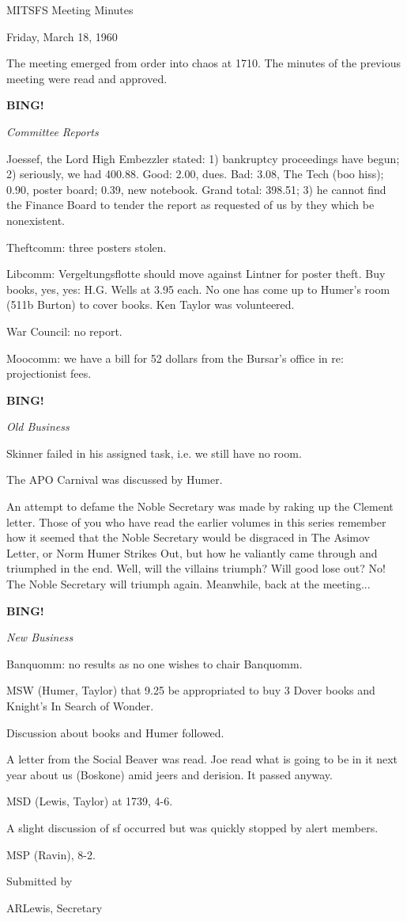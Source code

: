 \documentclass[12pt]{article}
\newcommand{\bing}{{\bf BING!} }
\newcommand{\goto}[1]{\bing \vskip 12pt \centerline{{\em{#1}}}}
\begin{document}
\begin{center}

MITSFS Meeting Minutes

Friday, March 18, 1960

\end{center}
 
\vspace{12pt}

\setlength{\parskip}{6pt}

\noindent
The meeting emerged from order into chaos at 1710. The minutes of the previous meeting were read and approved.

\goto{Committee Reports}

Joessef, the Lord High Embezzler stated: 1) bankruptcy proceedings have begun; 2) seriously, we had 400.88. Good: 2.00, dues. Bad: 3.08, The Tech (boo hiss); 0.90, poster board; 0.39, new notebook. Grand total: 398.51; 3) he cannot find the Finance Board to tender the report as requested of us by they which be nonexistent.

Theftcomm: three posters stolen.

Libcomm: Vergeltungsflotte should move against Lintner for poster theft. Buy books, yes, yes: H.G. Wells at 3.95 each. No one has come up to Humer's room (511b Burton) to cover books. Ken Taylor was volunteered.

War Council: no report.

Moocomm: we have a bill for 52 dollars from the Bursar's office in re: projectionist fees.

\goto{Old Business}

Skinner failed in his assigned task, i.e. we still have no room.

The APO Carnival was discussed by Humer.

An attempt to defame the Noble Secretary was made by raking up the Clement letter. Those of you who have read the earlier volumes in this series remember how it seemed that the Noble Secretary would be disgraced in The Asimov Letter, or Norm Humer Strikes Out, but how he valiantly came through and triumphed in the end. Well, will the villains triumph? Will good lose out? No! The Noble Secretary will triumph again. Meanwhile, back at the meeting...

\goto{New Business}

Banquomm: no results as no one wishes to chair Banquomm.

MSW (Humer, Taylor) that 9.25 be appropriated to buy 3 Dover books and Knight's In Search of Wonder.

Discussion about books and Humer followed.

A letter from the Social Beaver was read. Joe read what is going to be in it next year about us (Boskone) amid jeers and derision. It passed anyway.

MSD (Lewis, Taylor) at 1739, 4-6.

A slight discussion of sf occurred but was quickly stopped by alert members.

MSP (Ravin), 8-2.

\vspace{12pt}

\centerline{Submitted by}
\centerline{ARLewis, Secretary}
\end{document}
